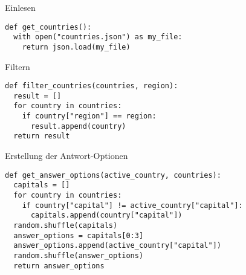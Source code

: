 \begin{fragile}

\begin{block}{Einlesen}
\vspace{2pt}
\begin{verbatim}
def get_countries():
  with open("countries.json") as my_file:
    return json.load(my_file)
\end{verbatim}
\end{block}

\vspace{12pt}
\pause 

\begin{block}{Filtern}
\vspace{2pt}
\begin{verbatim}
def filter_countries(countries, region):
  result = []
  for country in countries:
    if country["region"] == region:
      result.append(country)
  return result
\end{verbatim}
\end{block}

\end{fragile}

\begin{fragile}
	
\begin{block}{Erstellung der Antwort-Optionen}
\vspace{2pt}
\begin{verbatim}
def get_answer_options(active_country, countries):
  capitals = []
  for country in countries:
    if country["capital"] != active_country["capital"]:
      capitals.append(country["capital"])
  random.shuffle(capitals)
  answer_options = capitals[0:3]
  answer_options.append(active_country["capital"])
  random.shuffle(answer_options)
  return answer_options
\end{verbatim}
\end{block}

\end{fragile}

